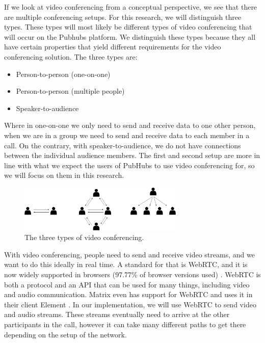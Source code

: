\documentclass{report}
\begin{document}
If we look at video conferencing from a conceptual perspective, we see that there are multiple conferencing setups.
For this research, we will distinguish three types. These types will most likely be different types of video
conferencing that will occur on the Pubhubs platform. We distinguish these types because
they all have certain properties that yield different requirements for the video conferencing solution. The three
types are:

\begin{itemize}
    \item Person-to-person (one-on-one)
    \item Person-to-person (multiple people)
    \item Speaker-to-audience
\end{itemize}

Where in one-on-one we only need to send and receive data to one other person, when we are in a
group we need to send and receive data to each member in a call. On the contrary, with speaker-to-audience, we do
not have connections between the individual audience members. The first and second setup are more in line with what
we expect the users of PubHubs to use video conferencing for, so we will focus on them in this research.

\begin{figure}[!hbt]
\centering
\includegraphics[width=0.7\textwidth]{img/three-types}
\caption{The three types of video conferencing.}
\label{fig:three-types-video-conferencing}
\end{figure}

With video conferencing, people need to send and receive video streams, and we want to do this ideally in real time.
A standard for that is WebRTC, and it is now widely supported in browsers (97.77\% of browser versions used) \cite{
noauthor_webrtc_nodate}. WebRTC is both a protocol and an API that can be used for many things, including video and audio communication.
Matrix even has support for WebRTC and uses it in their client Element \cite{noauthor_element_nodate}. In our
implementation, we will use WebRTC to send video and audio streams. These streams eventually need to arrive at
the other participants in the call, however it can take many different paths to get there depending on the setup of
the network.
\end{document}
